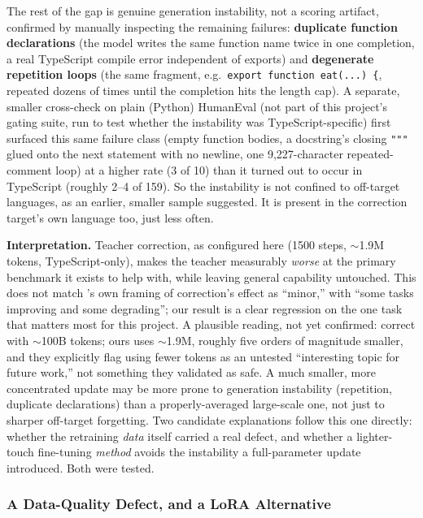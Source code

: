 \documentclass{article}
\theoremstyle{plain}
\theoremstyle{definition}
\theoremstyle{remark}
\begin{document}
The rest of the gap is genuine generation instability, not a scoring
artifact, confirmed by manually inspecting the remaining failures:
\textbf{duplicate function declarations} (the model writes the same
function name twice in one completion, a real TypeScript compile error
independent of exports) and \textbf{degenerate repetition loops} (the
same fragment, e.g.\ \texttt{export function eat(...) \{}, repeated
dozens of times until the completion hits the length cap). A separate,
smaller cross-check on plain (Python) HumanEval (not part of this
project's gating suite, run to test whether the instability was
TypeScript-specific) first surfaced this same failure class (empty
function bodies, a docstring's closing \texttt{"""} glued onto the next
statement with no newline, one 9,227-character repeated-comment loop)
at a higher rate (3 of 10) than it turned out to occur in TypeScript
(roughly 2--4 of 159). So the instability is not confined to
off-target languages, as an earlier, smaller sample suggested. It is
present in the correction target's own language too, just less often.

\textbf{Interpretation.} Teacher correction, as configured here (1500
steps, $\sim$1.9M tokens, TypeScript-only), makes the teacher measurably
\emph{worse} at the primary benchmark it exists to help with, while
leaving general capability untouched. This does not match
\citet{minitron2024practice}'s own framing of correction's effect as
``minor,'' with ``some tasks improving and some degrading''; our result
is a clear regression on the one task that matters most for this
project. A plausible reading, not yet confirmed: \citet{minitron2024practice}
correct with $\sim$100B tokens; ours uses $\sim$1.9M, roughly five
orders of magnitude smaller, and they explicitly flag using fewer tokens
as an untested ``interesting topic for future work,'' not something
they validated as safe. A much smaller, more concentrated update may be
more prone to generation instability (repetition, duplicate
declarations) than a properly-averaged large-scale one, not just to
sharper off-target forgetting. Two candidate explanations follow this
one directly: whether the retraining \emph{data} itself carried a real
defect, and whether a lighter-touch fine-tuning \emph{method} avoids the
instability a full-parameter update introduced. Both were tested.

\subsubsection{A Data-Quality Defect, and a LoRA Alternative}
\label{sec:teacher-correction-lora}
\end{document}
